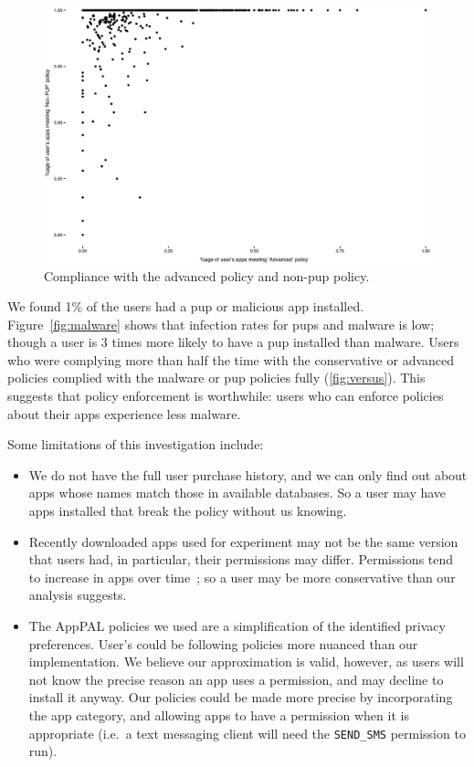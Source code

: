 \documentclass[]{llncs}
\begin{document}
\begin{figure}\centering
  \includegraphics[width=0.5\linewidth]{./figures/c_v_pup.eps}
  \caption{Compliance with the advanced policy and non-\ac{pup} policy.}
  \label{fig:versus}
\end{figure}

We found 1\% of the users had a \ac{pup} or malicious app installed.
Figure~\ref{fig:malware} shows that infection rates for \ac{pup}s and malware is low;
though a user is 3 times more likely to have a \ac{pup} installed than malware.
Users who were complying more than half the time with the conservative or advanced policies complied with the malware or \ac{pup} policies fully (\autoref{fig:versus}).
This suggests that policy enforcement is worthwhile: users who can enforce policies about their apps experience less malware.

Some limitations of this investigation include:
\begin{itemize}
\item
  We do not have the full user purchase history, and we can only find out about apps whose names match those in available databases.
  So a user may have apps installed that break the policy without us knowing.
\item
  Recently downloaded apps used for experiment may not be the same version that users had, in particular, their permissions may differ.
  Permissions tend to increase in apps over time~\cite{Wei:2012id}; so a user may be more conservative than our analysis suggests.
\item
  The AppPAL policies we used are a simplification of the identified privacy preferences.
  User's could be following policies more nuanced than our implementation.
  We believe our approximation is valid, however, as users will not know the precise reason an app uses a permission, and may decline to install it anyway.
  Our policies could be made more precise by incorporating the app category, and allowing apps to have a permission when it is appropriate (i.e.~a text messaging client will need the \texttt{SEND\_SMS} permission to run).
\end{itemize}
\end{document}
